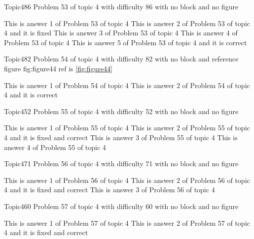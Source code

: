 \documentclass[master]{exam}
\begin{document}
\begin{problem}{Topic4}{86}
	Problem 53 of topic 4 with difficulty 86 with no block and no figure
	\begin{answers}
		\answer This is answer 1 of Problem 53 of topic 4 
		\answer[fixed] This is answer 2 of Problem 53 of topic 4 and it is fixed
		\answer This is answer 3 of Problem 53 of topic 4 
		\answer This is answer 4 of Problem 53 of topic 4 
		\answer[correct] This is answer 5 of Problem 53 of topic 4 and it is correct
	\end{answers}
\end{problem}

\begin{problem}{Topic4}{82}
	Problem 54 of topic 4 with difficulty 82 with no block and reference figure fig:figure44 ref is \ref{fig:figure44}
	\begin{answers}
		\answer This is answer 1 of Problem 54 of topic 4 
		\answer[correct] This is answer 2 of Problem 54 of topic 4 and it is correct
	\end{answers}
\end{problem}

\begin{problem}{Topic4}{52}
	Problem 55 of topic 4 with difficulty 52 with no block and no figure
	\begin{answers}
		\answer This is answer 1 of Problem 55 of topic 4 
		 This is answer 2 of Problem 55 of topic 4 and it is fixed and correct
		\answer This is answer 3 of Problem 55 of topic 4 
		\answer This is answer 4 of Problem 55 of topic 4 
	\end{answers}
\end{problem}

\begin{problem}{Topic4}{71}
	Problem 56 of topic 4 with difficulty 71 with no block and no figure
	\begin{answers}
		\answer This is answer 1 of Problem 56 of topic 4 
		 This is answer 2 of Problem 56 of topic 4 and it is fixed and correct
		\answer This is answer 3 of Problem 56 of topic 4 
	\end{answers}
\end{problem}

\begin{problem}{Topic4}{60}
	Problem 57 of topic 4 with difficulty 60 with no block and no figure
	\begin{answers}
		\answer This is answer 1 of Problem 57 of topic 4 
		 This is answer 2 of Problem 57 of topic 4 and it is fixed and correct
	\end{answers}
\end{problem}
\end{document}
